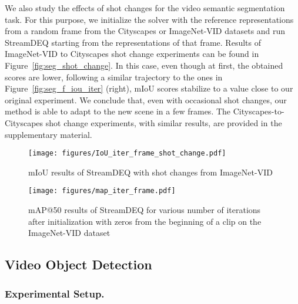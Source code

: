 \documentclass[runningheads]{llncs}
\begin{document}
We also study the effects of shot changes for the video semantic segmentation task. For this purpose, we initialize the solver with the reference representations from a random frame from the Cityscapes or ImageNet-VID datasets and run StreamDEQ starting from the representations of that frame. Results of ImageNet-VID to Cityscapes shot change experiments can be found in Figure~\ref{fig:seg_shot_change}. In this case, even though at first, the obtained scores are lower, following a similar trajectory to the ones in Figure~\ref{fig:seg_f_iou_iter} (right), mIoU scores stabilize to a value close to our original experiment. We conclude that, even with occasional shot changes, our method is able to adapt to the new scene in a few frames. The Cityscapes-to-Cityscapes shot change experiments, with similar results, are provided in the supplementary material.


\begin{figure*}[t]
  \begin{minipage}[t]{0.47\linewidth}
    \texttt{[image: figures/IoU\_iter\_frame\_shot\_change.pdf]}
    \caption{mIoU results of StreamDEQ with shot changes from ImageNet-VID}
    \label{fig:seg_shot_change}
  \end{minipage}\hfill \begin{minipage}[t]{0.47\linewidth}
    \texttt{[image: figures/map\_iter\_frame.pdf]}
    \caption{mAP@50 results of StreamDEQ for various number of iterations after initialization with zeros from the beginning of a clip on the ImageNet-VID dataset}
    \label{fig:map_iter_frame}
  \end{minipage}
\end{figure*}


\subsection{Video Object Detection}


\subsubsection{Experimental Setup.}
\end{document}
